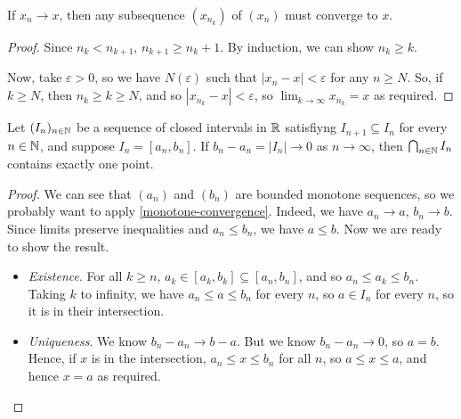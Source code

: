 \documentclass{../../template/note}
\begin{document}
    \begin{lemma}
        If \(x_n \to x\), then any subsequence \((x_{n_k})\) of \((x_n)\) must converge to \(x\).
    \end{lemma}
    
    \begin{proof}
        Since \(n_k < n_{k+1}\), \(n_{k+1} \geq n_k + 1\). By induction, we can show \(n_k \geq k\).

        Now, take \(\varepsilon > 0\), so we have \(N(\varepsilon)\) such that \(|x_n-x| < \varepsilon\) for any \(n \geq N\). So, if \(k \geq N\), then \(n_k \geq k \geq N\), and so \(|x_{n_k}-x|<\varepsilon\), so \(\lim_{k \to \infty}x_{n_k} = x\) as required.
    \end{proof}
    
    \begin{proposition}
        \label{nested-interval}
        Let \((I_n)_{n \in \mathbb N}\) be a sequence of closed intervals in \(\mathbb R\) satisfiyng \(I_{n+1} \subseteq I_n\) for every \(n \in \mathbb N\), and suppose \(I_n = [a_n, b_n]\). If \(b_n - a_n = |I_n| \to 0\) as \(n \to \infty\), then \(\bigcap_{n \in \mathbb N} I_n\) contains exactly one point.
    \end{proposition}
    
    \begin{proof}
        We can see that \((a_n)\) and \((b_n)\) are bounded monotone sequences, so we probably want to apply \cref{monotone-convergence}. Indeed, we have \(a_n \to a\), \(b_n \to b\). Since limits preserve inequalities and \(a_n \leq b_n\), we have \(a \leq b\). Now we are ready to show the result.
        \begin{itemize}
            \item \emph{Existence}. For all \(k \geq n\), \(a_k \in [a_k, b_k] \subseteq [a_n, b_n]\), and so \(a_n \leq a_k \leq b_n\). Taking \(k\) to infinity, we have \(a_n \leq a \leq b_n\) for every \(n\), so \(a \in I_n\) for every \(n\), so it is in their intersection.
            \item \emph{Uniqueness}. We know \(b_n - a_n \to b - a\). But we know \(b_n - a_n \to 0\), so \(a = b\). Hence, if \(x\) is in the intersection, \(a_n \leq x \leq b_n\) for all \(n\), so \(a \leq x \leq a\), and hence \(x=a\) as required.
        \end{itemize}
    \end{proof}
    
\end{document}

